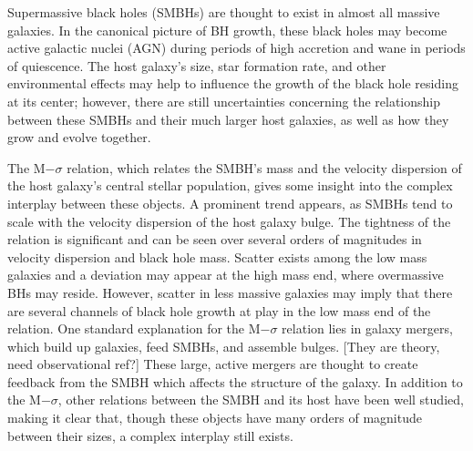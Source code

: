 \documentclass[manuscript]{aastex}
\begin{document}

Supermassive black holes (SMBHs) are thought to exist in almost all massive galaxies. \citep{Kormendy2013} In the canonical picture of BH growth, these black holes may become active galactic nuclei (AGN) during periods of high accretion and wane in periods of quiescence. \citep{Volonteri2012,Alexander2005,Papovich2006} The host galaxy's size, star formation rate, and other environmental effects may help to influence the growth of the black hole residing at its center; however, there are still uncertainties concerning the relationship between these SMBHs and their much larger host galaxies, as well as how they grow and evolve together. \citep[Need more refs here; how many? Should I cite as many people as Jillian does? More?]{Fu2008}

The M$-\sigma$ relation, which relates the SMBH's mass and the velocity dispersion of the host galaxy's central stellar population, gives some insight into the complex interplay between these objects. \citep{Kormendy2013} A prominent trend appears, as SMBHs tend to scale with the velocity dispersion of the host galaxy bulge. %
The tightness of the relation is significant and can be seen over several orders of magnitudes in velocity dispersion and black hole mass. \citep{Mcconnell2013,Kormendy2013,Merritt2001} Scatter exists among the low mass galaxies and a deviation may appear at the high mass end, where overmassive BHs may reside. \citep{Moster2010,Natarajan2011} However, scatter in less massive galaxies may imply that there are several channels of black hole growth at play in the low mass end of the relation. \citep{Micic2007,Volonteri2009,Graham2014} One standard explanation for the M$-\sigma$ relation lies in galaxy mergers, which build up galaxies, feed SMBHs, and assemble bulges. \citep{DiMatteo2005} [They are theory, need observational ref?] These large, active mergers are thought to create feedback from the SMBH which affects the structure of the galaxy. In addition to the M$-\sigma$, other relations between the SMBH and its host have been well studied, making it clear that, though these objects have many orders of magnitude between their sizes, a complex interplay still exists.
\end{document}
